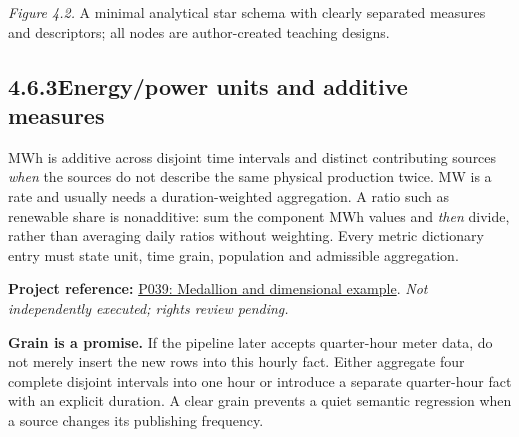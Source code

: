 \documentclass[11pt,twoside]{article}
\newcommand{\topic}[2]{\subsection*{#1\quad #2}}
\newcommand{\repo}[2]{\par\begingroup\fontsize{8.0}{9.6}\selectfont\sffamily\color{inkgray}\textbf{Project reference:} \href{#2}{#1}. \textit{Not independently executed; rights review pending.}\par\endgroup}
\begin{document}
\begin{center}
\end{center}
\textit{Figure 4.2.} A minimal analytical star schema with clearly separated measures and descriptors; all nodes are author-created teaching designs.

\topic{4.6.3}{Energy/power units and additive measures}
MWh is additive across disjoint time intervals and distinct contributing sources \emph{when} the sources do not describe the same physical production twice. MW is a rate and usually needs a duration-weighted aggregation. A ratio such as renewable share is nonadditive: sum the component MWh values and \emph{then} divide, rather than averaging daily ratios without weighting. Every metric dictionary entry must state unit, time grain, population and admissible aggregation.
\repo{P039: Medallion and dimensional example}{https://github.com/Jb-Analytics/snowflake-dbt-tpch-medallion}


\textbf{Grain is a promise.} If the pipeline later accepts quarter-hour meter data, do not merely insert the new rows into this hourly fact. Either aggregate four complete disjoint intervals into one hour or introduce a separate quarter-hour fact with an explicit duration. A clear grain prevents a quiet semantic regression when a source changes its publishing frequency.
\end{document}

